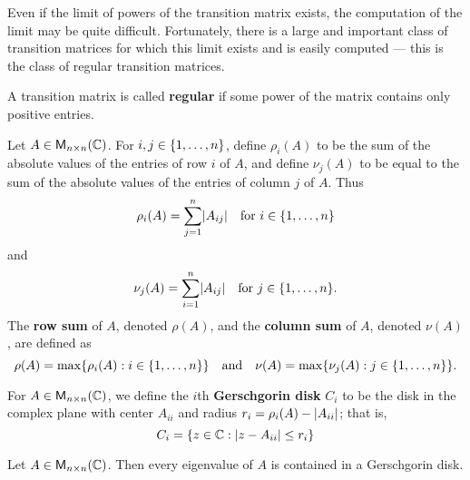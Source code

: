 \begin{note}
  Even if the limit of powers of the transition matrix exists, the computation of the limit may be quite difficult.
  Fortunately, there is a large and important class of transition matrices for which this limit exists and is easily computed
  --- this is the class of regular transition matrices.
\end{note}

\begin{defn}\label{5.3.7}
  A transition matrix is called \textbf{regular} if some power of the matrix contains only positive entries.
\end{defn}

\begin{defn}\label{5.3.8}
  Let \(A \in \ms[n][n][\C]\).
  For \(i, j \in \left\lbrace1, \dots, n\right\rbrace\), define \(\rho_i(A)\) to be the sum of the absolute values of the entries of row \(i\) of \(A\), and define \(\nu_j(A)\) to be equal to the sum of the absolute values of the entries of column \(j\) of \(A\).
  Thus
  \[
    \rho_i(A) = \sum_{j = 1}^n \abs{A_{i j}} \quad \text{for } i \in \set{1, \dots, n}
  \]
  and
  \[
    \nu_j(A) = \sum_{i = 1}^n \abs{A_{i j}} \quad \text{for } j \in \set{1, \dots, n}.
  \]
  The \textbf{row sum} of \(A\), denoted \(\rho(A)\), and the \textbf{column sum} of \(A\), denoted \(\nu(A)\), are defined as
  \[
    \rho(A) = \max\set{\rho_i(A) : i \in \set{1, \dots, n}} \quad \text{and} \quad \nu(A) = \max\set{\nu_j(A) : j \in \set{1, \dots, n}}.
  \]
\end{defn}

\begin{defn}\label{5.3.9}
  For \(A \in \ms[n][n][\C]\), we define the \(i\)th \textbf{Gerschgorin disk} \(C_i\) to be the disk in the complex plane with center \(A_{i i}\) and radius \(r_i = \rho_i(A) - \left\lvert A_{i i}\right\rvert\);
  that is,
  \[
    C_i = \left\lbrace z \in \mathbb{C} : \left\lvert z - A_{i i}\right\rvert \leq r_i\right\rbrace
  \]
\end{defn}

\begin{thm}\label{5.16}
  Let \(A \in \ms[n][n][\C]\).
  Then every eigenvalue of \(A\) is contained in a Gerschgorin disk.
\end{thm}

